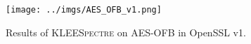 \documentclass[12pt,a4paper]{book}
\theoremstyle{definition}
\begin{document}
	\begin{figure}
		\centering
		\texttt{[image: ../imgs/AES\_OFB\_v1.png]}
		\captionsetup{width=.8\linewidth}
		\caption{Results of \textsc{KLEESpectre} on AES-OFB in OpenSSL v1.}
		\label{fig:result_ofb_v1}
	\end{figure}
	\begin{comment}
		\paragraph{Testing OpenSSL v3} In this paragraph, we repeat the same tests on OpenSSL v3 (more precisely, on version 3.0.0), to see if something has changed after the discovery of Spectre. In order to reproduce these tests, one should run \texttt{test\_KLEESpectre\_v3.sh} and eventually substituting in every testing file the line \texttt{\#include "aes\_locl.h"} with \texttt{\#include "aes\_local.h"}. Figures \ref{fig:result_cbc_v3}, \ref{fig:result_ctr_v3}, and \ref{fig:result_ofb_v3} show the results obtained. Let's start with AES-CBC: the count of alleged Spectre vulnerabilities is still 4, but most of them are different with respect to the previous tests.
		
		\begin{figure}
			\centering
			\texttt{[image: ../imgs/AES\_CBC\_v3.png]}
			\captionsetup{width=.8\linewidth}
			\caption{Results of \textsc{KLEESpectre} on AES-CBC in OpenSSL v3.}
			\label{fig:result_cbc_v3}
		\end{figure}
		
		The first vulnerability involves once again two different files: according to the output, the branch identified as vulnerable is located on line 671 of \texttt{aes\_core.c}, while the instruction responsible for performing a dangerous loading is on line 61 of \texttt{cbc128.c}. The corresponding listings are reported in \ref{aes-core3} and \ref{cbc128_3}.
		
		\begin{minipage}{.9\textwidth}
			\begin{lstlisting}[caption={\texttt{aes\_core.c}}, label=aes-core3, firstnumber=667]
				void AES_encrypt(const unsigned char *in, unsigned char *out, const AES_KEY *key){
					
					const u64 *rk;
					
					assert(in && out && key);
					rk = (u64*)key->rd_key;
					
					Cipher(in, out, rk, key->rounds);
				}
			\end{lstlisting}
		\end{minipage}
		

\end{comment}
\end{document}
